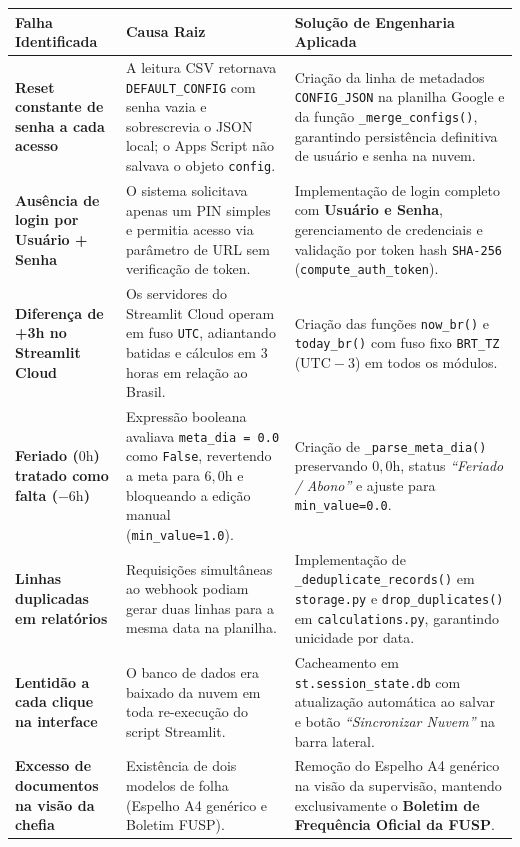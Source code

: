 \documentclass[11pt,a4paper]{article}
\begin{document}
\begin{longtable}{>{\bfseries\color{icmcDark}}p{3.8cm} p{5.2cm} p{6.0cm}}
\toprule
\textbf{Falha Identificada} & \textbf{Causa Raiz} & \textbf{Solução de Engenharia Aplicada} \\
\midrule
\endhead
Reset constante de senha a cada acesso & A leitura CSV retornava \texttt{DEFAULT\_CONFIG} com senha vazia e sobrescrevia o JSON local; o Apps Script não salvava o objeto \texttt{config}. & Criação da linha de metadados \texttt{CONFIG\_JSON} na planilha Google e da função \texttt{\_merge\_configs()}, garantindo persistência definitiva de usuário e senha na nuvem. \\
\midrule
Ausência de login por Usuário + Senha & O sistema solicitava apenas um PIN simples e permitia acesso via parâmetro de URL sem verificação de token. & Implementação de login completo com \textbf{Usuário e Senha}, gerenciamento de credenciais e validação por token hash \texttt{SHA-256} (\texttt{compute\_auth\_token}). \\
\midrule
Diferença de +3h no Streamlit Cloud & Os servidores do Streamlit Cloud operam em fuso \texttt{UTC}, adiantando batidas e cálculos em 3 horas em relação ao Brasil. & Criação das funções \texttt{now\_br()} e \texttt{today\_br()} com fuso fixo \texttt{BRT\_TZ} ($\text{UTC}-3$) em todos os módulos. \\
\midrule
Feriado ($0\text{h}$) tratado como falta ($-6\text{h}$) & Expressão booleana avaliava \texttt{meta\_dia = 0.0} como \texttt{False}, revertendo a meta para $6,0\text{h}$ e bloqueando a edição manual (\texttt{min\_value=1.0}). & Criação de \texttt{\_parse\_meta\_dia()} preservando $0,0\text{h}$, status \textit{``Feriado / Abono''} e ajuste para \texttt{min\_value=0.0}. \\
\midrule
Linhas duplicadas em relatórios & Requisições simultâneas ao webhook podiam gerar duas linhas para a mesma data na planilha. & Implementação de \texttt{\_deduplicate\_records()} em \texttt{storage.py} e \texttt{drop\_duplicates()} em \texttt{calculations.py}, garantindo unicidade por data. \\
\midrule
Lentidão a cada clique na interface & O banco de dados era baixado da nuvem em toda re-execução do script Streamlit. & Cacheamento em \texttt{st.session\_state.db} com atualização automática ao salvar e botão \textit{``Sincronizar Nuvem''} na barra lateral. \\
\midrule
Excesso de documentos na visão da chefia & Existência de dois modelos de folha (Espelho A4 genérico e Boletim FUSP). & Remoção do Espelho A4 genérico na visão da supervisão, mantendo exclusivamente o \textbf{Boletim de Frequência Oficial da FUSP}. \\
\bottomrule
\end{longtable}
\end{document}
